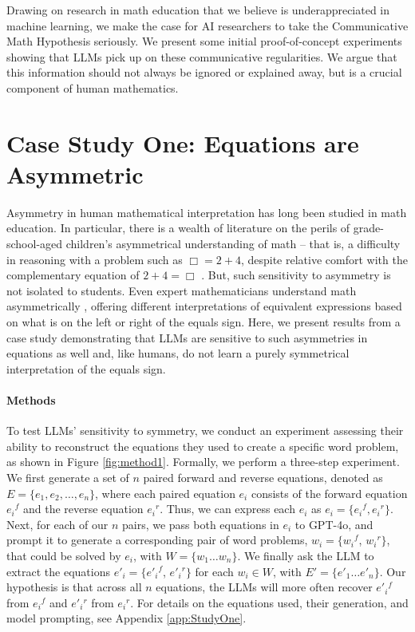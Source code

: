 \documentclass{article}
\begin{document}
Drawing on research in math education that we believe is underappreciated in machine learning, we make the case for AI researchers to take the Communicative Math Hypothesis seriously.
We present some initial proof-of-concept experiments showing that LLMs pick up on these communicative regularities. We argue that this information should not always be ignored or explained away, but is a crucial component of human mathematics.

\section{Case Study One: Equations are Asymmetric}


Asymmetry in human mathematical interpretation has long been studied in math education. 
In particular, there is a wealth of literature on the perils of grade-school-aged children's asymmetrical understanding of math -- that is, a difficulty in reasoning with a problem such as \(\Box = 2 + 4\), despite relative comfort with the complementary equation of \(2 + 4 = \Box\) \citep{behr1980children, powell2012equations}.
But, such sensitivity to asymmetry is not isolated to students. Even expert mathematicians understand math asymmetrically \citep{mirin2022mathematicians}, offering different interpretations of equivalent expressions based on what is on the left or right of the equals sign. Here, we present results from a case study demonstrating that LLMs are sensitive to such asymmetries in equations as well and, like humans, do not learn a purely symmetrical interpretation of the equals sign.

\paragraph{Methods} To test LLMs' sensitivity to symmetry, we conduct an experiment assessing their ability to reconstruct the equations they used to create a specific word problem, as shown in Figure \ref{fig:method1}. 
Formally, we perform a three-step experiment. We first generate a set of \( n \) paired forward and reverse equations, denoted as \( E = \{ e_1, e_2, \ldots, e_n \} \), where each paired equation \( e_i \) consists of the forward equation \( {e_i}^f \) and the reverse equation \( {e_i}^r \). Thus, we can express each \( e_i \) as \( e_i = \{ {e_i}^f, {e_i}^r \} \). Next, for each of our \( n \) pairs, we pass both equations in \(e_i\) to GPT-4o, and prompt it to generate a corresponding pair of word problems, \(w_i = \{w_i{}^f\), \(w_i{}^r\}\), that could be solved by \(e_i\), with \(W = \{w_1 \dots w_n\}\). We finally ask the LLM to extract the equations \(e'_i = \{e'_i{}^f\), \(e'_i{}^r\}\) for each \(w_i\in W\), with \(E' = \{e'_1\dots e'_n\}\). Our hypothesis is that across all \(n\) equations, the LLMs will more often recover \(e'_i{}^f\) from \(e_i{}^f\) and \(e'_i{}^r\) from \(e_i{}^r\). 
For details on the equations used, their generation, and model prompting, see Appendix \ref{app:StudyOne}.
\end{document}
